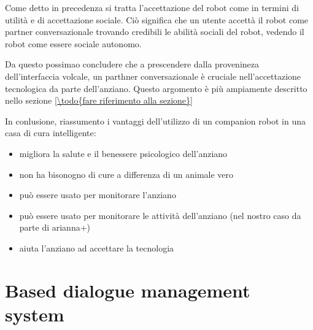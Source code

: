 \documentclass{thesisreport}
\begin{document}
 Come detto in precedenza si tratta l'accettazione del robot come in termini di utilità e di accettazione sociale. Ciò significa che un utente accettà il robot come partner conversazionale  trovando credibili le abilità sociali del robot, vedendo il robot come essere sociale autonomo. 
 
 Da questo possimao concludere che a prescendere dalla provenineza dell'interfaccia volcale, un parthner conversazionale è cruciale nell'accettazione tecnologica da parte dell'anziano. Questo argomento è più ampiamente descritto nello sezione \ref{\todo{fare riferimento alla sezione}}
 
 In conlusione, riassumento i vantaggi dell'utilizzo di un companion robot in una casa di cura intelligente:
 \begin{itemize}
     \item migliora la salute e il benessere psicologico dell'anziano 
     \item non ha bisonogno di cure a differenza di un animale vero
     \item può essere usato per monitorare l'anziano
     \item può essere usato per monitorare le attività dell'anziano (nel nostro caso da parte di arianna+)
     \item aiuta l'anziano ad accettare la tecnologia
 \end{itemize}

 \section{Based dialogue management system} \label{speech}

  
 
 
 
 
\end{document}
